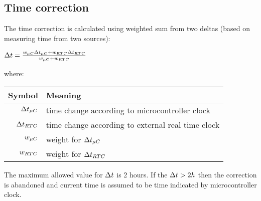 
\subsection{Time correction}\label{obc:proc:time-correction}

The time correction is calculated using weighted sum from two deltas (based on measuring time from two sources):

$\Delta t = \frac{w_{\mu C} \Delta t_{\mu C} + w_{RTC} \Delta t_{RTC}}{w_{\mu C} + w_{RTC}}$

where:

\begin{tabular}{r | l}
	Symbol & Meaning \\
	\hline
	$\Delta t_{\mu C}$ & time change according to microcontroller clock \\ 
	$\Delta t_{RTC}$ & time change according to external real time clock \\
	\label{sec:time-wMcu} $w_{\mu C}$ & weight for $\Delta t_{\mu C}$ \\
	\label{sec:time-wRtc} $w_{RTC}$ & weight for $\Delta t_{RTC}$ \\
\end{tabular}

The maximum allowed value for $\Delta t$ is 2 hours. If the $\Delta t > 2 h$ then the correction is abandoned and current time is assumed to be time indicated by microcontroller clock.